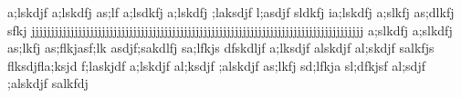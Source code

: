                                                                      a;lskdjf a;lskdfj as;lf                                                                                        a;lsdkfj a;lskdfj ;laksdjf l;asdjf sldkfj                                                                                                                           ia;lskdfj a;slkfj as;dlkfj sfkj jjjjjjjjjjjjjjjjjjjjjjjjjjjjjjjjjjjjjjjjjjjjjjjjjjjjjjjjjjjjjjjjjjjjjjjjjjjjjjjjjjjjj                                           a;slkdfj a;slkdfj as;lkfj as;flkjasf;lk asdjf;sakdlfj sa;lfkjs dfskdljf a;lksdjf  alskdjf al;skdjf salkfjs flksdjfla;ksjd f;laskjdf                                                                                                             a;lskdjf al;ksdjf ;alskdjf as;lkfj sd;lfkja sl;dfkjsf                           al;sdjf ;alskdjf salkfdj                                                                                                                                                                 
